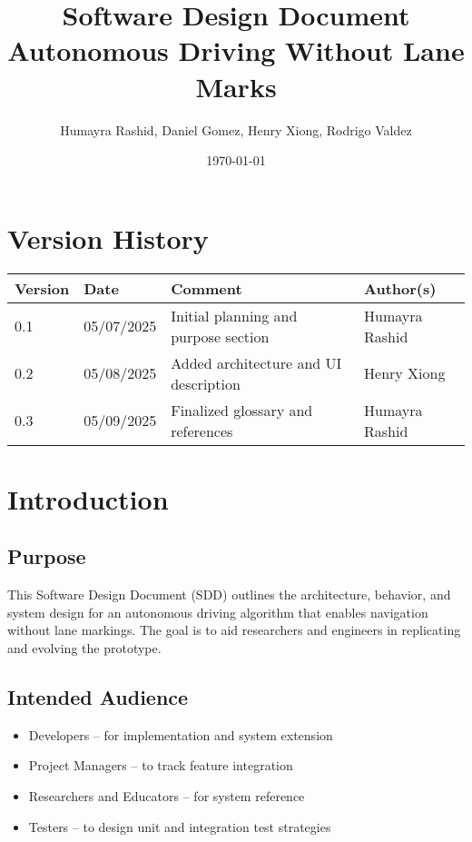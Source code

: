 \documentclass[12pt]{article}
\title{Software Design Document\\\large Autonomous Driving Without Lane Marks}
\author{Humayra Rashid, Daniel Gomez, Henry Xiong, Rodrigo Valdez}
\date{\today}
\begin{document}
\maketitle
\thispagestyle{empty}

\section*{Version History}
\begin{tabular}{|l|l|l|l|}
\hline
\textbf{Version} & \textbf{Date} & \textbf{Comment} & \textbf{Author(s)} \\
\hline
0.1 & 05/07/2025 & Initial planning and purpose section & Humayra Rashid \\
\hline
0.2 & 05/08/2025 & Added architecture and UI description & Henry Xiong \\
\hline
0.3 & 05/09/2025 & Finalized glossary and references & Humayra Rashid \\
\hline
\end{tabular}

\newpage

\tableofcontents
\newpage

\section{Introduction}
\subsection{Purpose}
This Software Design Document (SDD) outlines the architecture, behavior, and system design for an autonomous driving algorithm that enables navigation without lane markings. The goal is to aid researchers and engineers in replicating and evolving the prototype.

\subsection{Intended Audience}
\begin{itemize}
  \item Developers – for implementation and system extension
  \item Project Managers – to track feature integration
  \item Researchers and Educators – for system reference
  \item Testers – to design unit and integration test strategies
\end{itemize}
\end{document}
